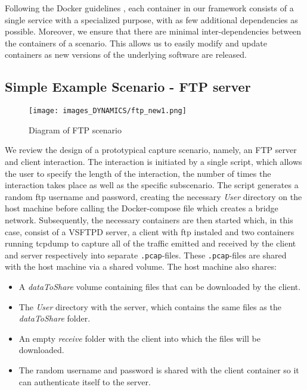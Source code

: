 Following the Docker guidelines \cite{bestpractise}, each container in our framework consists of a single service with a specialized purpose, with as few additional dependencies as possible. %
Moreover, we ensure that there are minimal inter-dependencies between the containers of a scenario. This allows us to easily modify and update containers as new versions of the underlying software are released.



 


\subsection{Simple Example Scenario - FTP server}
\begin{figure}%
\centering
\texttt{[image: images\_DYNAMICS/ftp\_new1.png]}
\caption{Diagram of FTP scenario}
\end{figure}

We review the design of a prototypical capture scenario, namely, an FTP server and client interaction. The interaction is initiated by a single script, which allows the user to specify the length of the interaction, the number of times the interaction takes place as well as the specific subscenario. The script generates a random ftp username and password, creating the necessary \textit{User} directory on the host machine before calling the Docker-compose file which creates a bridge network. Subsequently, the necessary containers are then started which, in this case, consist of a VSFTPD server, a client with ftp instaled and two containers running tcpdump to capture all of the traffic emitted and received by the client and server respectively into separate \texttt{.pcap}-files. These \texttt{.pcap}-files are shared with the host machine via a shared volume. The host machine also shares:
 
\begin{itemize}
\item A \textit{dataToShare} volume containing files that can be downloaded by the client.
\item The \textit{User} directory with the server, which contains the same files as the \textit{dataToShare} folder.
\item An empty \textit{receive} folder with the client into which the files will be downloaded.
\item The random username and password is shared with the client container so it can authenticate itself to the server.
\end{itemize}
 
